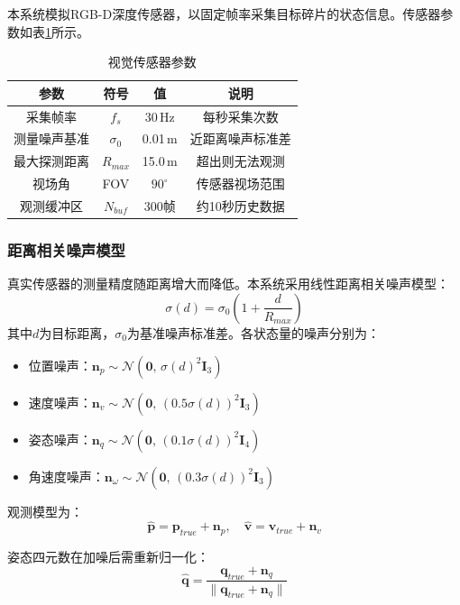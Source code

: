 \documentclass[12pt,a4paper]{ctexart}
\begin{document}
本系统模拟RGB-D深度传感器，以固定帧率采集目标碎片的状态信息。传感器参数如表\ref{tab:sensor}所示。

\begin{table}[H]
\centering
\caption{视觉传感器参数}
\label{tab:sensor}
\begin{tabular}{cccc}
\toprule
参数 & 符号 & 值 & 说明 \\
\midrule
采集帧率   & $f_s$      & 30\,Hz   & 每秒采集次数 \\
测量噪声基准 & $\sigma_0$ & 0.01\,m  & 近距离噪声标准差 \\
最大探测距离 & $R_{max}$  & 15.0\,m  & 超出则无法观测 \\
视场角     & FOV        & $90^\circ$ & 传感器视场范围 \\
观测缓冲区  & $N_{buf}$  & 300帧    & 约10秒历史数据 \\
\bottomrule
\end{tabular}
\end{table}

\subsubsection{距离相关噪声模型}

真实传感器的测量精度随距离增大而降低。本系统采用线性距离相关噪声模型：
\begin{equation}
  \sigma(d) = \sigma_0 \left(1 + \frac{d}{R_{max}}\right)
\end{equation}
其中$d$为目标距离，$\sigma_0$为基准噪声标准差。各状态量的噪声分别为：
\begin{itemize}
  \item 位置噪声：$\mathbf{n}_p \sim \mathcal{N}(\mathbf{0},\, \sigma(d)^2 \mathbf{I}_3)$
  \item 速度噪声：$\mathbf{n}_v \sim \mathcal{N}(\mathbf{0},\, (0.5\sigma(d))^2 \mathbf{I}_3)$
  \item 姿态噪声：$\mathbf{n}_q \sim \mathcal{N}(\mathbf{0},\, (0.1\sigma(d))^2 \mathbf{I}_4)$
  \item 角速度噪声：$\mathbf{n}_\omega \sim \mathcal{N}(\mathbf{0},\, (0.3\sigma(d))^2 \mathbf{I}_3)$
\end{itemize}

观测模型为：
\begin{equation}
  \hat{\mathbf{p}} = \mathbf{p}_{true} + \mathbf{n}_p, \quad \hat{\mathbf{v}} = \mathbf{v}_{true} + \mathbf{n}_v
\end{equation}

姿态四元数在加噪后需重新归一化：
\begin{equation}
  \hat{\mathbf{q}} = \frac{\mathbf{q}_{true} + \mathbf{n}_q}{\|\mathbf{q}_{true} + \mathbf{n}_q\|}
\end{equation}
\end{document}
